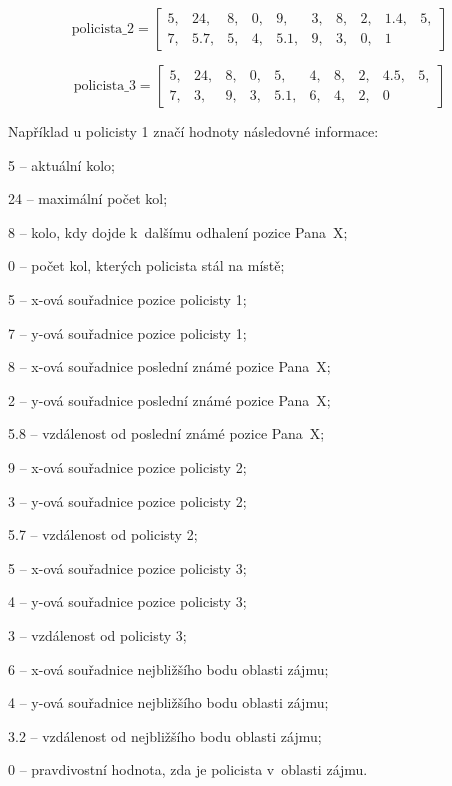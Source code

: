 \[
\text{policista\_2} = \begin{bmatrix}
5, & 24, & 8, & 0, & 9, & 3, & 8, & 2, & 1.4, & 5, \\
7, & 5.7, & 5, & 4, & 5.1, & 9, & 3, & 0, & 1
\end{bmatrix}
\]

\[
\text{policista\_3} = \begin{bmatrix}
5, & 24, & 8, & 0, & 5, & 4, & 8, & 2, & 4.5, & 5, \\
7, & 3, & 9, & 3, & 5.1, & 6, & 4, & 2, & 0
\end{bmatrix}
\]

\pagebreak

Například u policisty 1 značí hodnoty následovné informace:
\begin{myitemize}
  \item 5 -- aktuální kolo;
  \item 24 -- maximální počet kol;
  \item 8 -- kolo, kdy dojde k~dalšímu odhalení pozice Pana~X;
  \item 0 -- počet kol, kterých policista stál na místě;
  \item 5 -- x-ová souřadnice pozice policisty 1;
  \item 7 -- y-ová souřadnice pozice policisty 1;
  \item 8 -- x-ová souřadnice poslední známé pozice Pana~X;
  \item 2 -- y-ová souřadnice poslední známé pozice Pana~X;
  \item 5.8 -- vzdálenost od poslední známé pozice Pana~X;
  \item 9 -- x-ová souřadnice pozice policisty 2;
  \item 3 -- y-ová souřadnice pozice policisty 2;
  \item 5.7 -- vzdálenost od policisty 2;
  \item 5 -- x-ová souřadnice pozice policisty 3;
  \item 4 -- y-ová souřadnice pozice policisty 3;
  \item 3 -- vzdálenost od policisty 3;
  \item 6 -- x-ová souřadnice nejbližšího bodu oblasti zájmu;
  \item 4 -- y-ová souřadnice nejbližšího bodu oblasti zájmu;
  \item 3.2 -- vzdálenost od nejbližšího bodu oblasti zájmu;
  \item 0 -- pravdivostní hodnota, zda je policista v~oblasti zájmu.
\end{myitemize}

